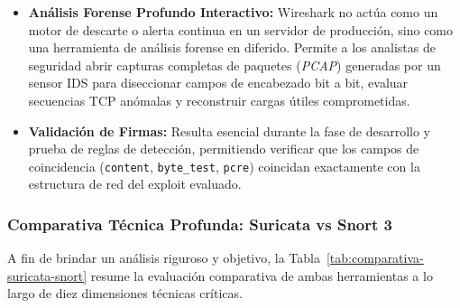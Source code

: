 \begin{itemize}
  \item \textbf{Análisis Forense Profundo Interactivo:} Wireshark no actúa como un motor de descarte o alerta continua en un servidor de producción, sino como una herramienta de análisis forense en diferido. Permite a los analistas de seguridad abrir capturas completas de paquetes (\textit{PCAP}) generadas por un sensor IDS para diseccionar campos de encabezado bit a bit, evaluar secuencias TCP anómalas y reconstruir cargas útiles comprometidas.
  \item \textbf{Validación de Firmas:} Resulta esencial durante la fase de desarrollo y prueba de reglas de detección, permitiendo verificar que los campos de coincidencia (\texttt{content}, \texttt{byte\_test}, \texttt{pcre}) coincidan exactamente con la estructura de red del exploit evaluado.
\end{itemize}

\subsubsection{Comparativa Técnica Profunda: Suricata vs Snort 3}

A fin de brindar un análisis riguroso y objetivo, la Tabla~\ref{tab:comparativa-suricata-snort} resume la evaluación comparativa de ambas herramientas a lo largo de diez dimensiones técnicas críticas.

